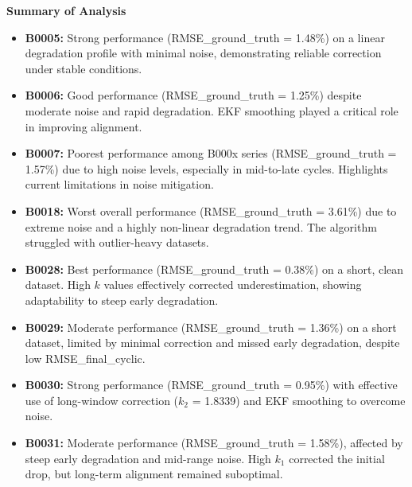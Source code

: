 \textbf{Summary of Analysis}
\begin{itemize}
    \item \textbf{B0005:} Strong performance (RMSE\_ground\_truth = 1.48\%) on a linear degradation profile with minimal noise, demonstrating reliable correction under stable conditions.
    
    \item \textbf{B0006:} Good performance (RMSE\_ground\_truth = 1.25\%) despite moderate noise and rapid degradation. EKF smoothing played a critical role in improving alignment.
    
    \item \textbf{B0007:} Poorest performance among B000x series (RMSE\_ground\_truth = 1.57\%) due to high noise levels, especially in mid-to-late cycles. Highlights current limitations in noise mitigation.
    
    \item \textbf{B0018:} Worst overall performance (RMSE\_ground\_truth = 3.61\%) due to extreme noise and a highly non-linear degradation trend. The algorithm struggled with outlier-heavy datasets.
    
    \item \textbf{B0028:} Best performance (RMSE\_ground\_truth = 0.38\%) on a short, clean dataset. High $k$ values effectively corrected underestimation, showing adaptability to steep early degradation.
    
    \item \textbf{B0029:} Moderate performance (RMSE\_ground\_truth = 1.36\%) on a short\\ dataset, limited by minimal correction and missed early degradation, despite low RMSE\_final\_cyclic.
    
    \item \textbf{B0030:} Strong performance (RMSE\_ground\_truth = 0.95\%) with effective use of long-window correction ($k_2$ = 1.8339) and EKF smoothing to overcome noise.
    
    \item \textbf{B0031:} Moderate performance (RMSE\_ground\_truth = 1.58\%), affected by steep early degradation and mid-range noise. High $k_1$ corrected the initial drop, but long-term alignment remained suboptimal.
\end{itemize}

